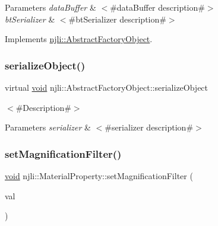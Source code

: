 \begin{DoxyParams}{Parameters}
{\em data\+Buffer} & $<$\#data\+Buffer description\#$>$ \\
\hline
{\em bt\+Serializer} & $<$\#bt\+Serializer description\#$>$ \\
\hline
\end{DoxyParams}


Implements \mbox{\hyperlink{classnjli_1_1_abstract_factory_object_aad2fbe86fb3bdecf02918a96b9c57976}{njli\+::\+Abstract\+Factory\+Object}}.

\mbox{\label{classnjli_1_1_material_property_a4fc4bcd9d1930911474210c047372fc0}} 
\subsubsection{\texorpdfstring{serialize\+Object()}{serializeObject()}}
{\footnotesize\ttfamily virtual \mbox{\hyperlink{_thread_8h_af1e856da2e658414cb2456cb6f7ebc66}{void}} njli\+::\+Abstract\+Factory\+Object\+::serialize\+Object}

$<$\#\+Description\#$>$


\begin{DoxyParams}{Parameters}
{\em serializer} & $<$\#serializer description\#$>$ \\
\hline
\end{DoxyParams}
\mbox{\label{classnjli_1_1_material_property_ac8519825cbf12f274d2cfea9d1afcc64}} 
\subsubsection{\texorpdfstring{set\+Magnification\+Filter()}{setMagnificationFilter()}}
{\footnotesize\ttfamily \mbox{\hyperlink{_thread_8h_af1e856da2e658414cb2456cb6f7ebc66}{void}} njli\+::\+Material\+Property\+::set\+Magnification\+Filter (\begin{DoxyParamCaption}\item[{\mbox{\hyperlink{namespacenjli_a9fe7a080d946c5be3afc71d834dc7902}{njli\+Texture\+Magnification\+Value\+Type}}}]{val }\end{DoxyParamCaption})}

